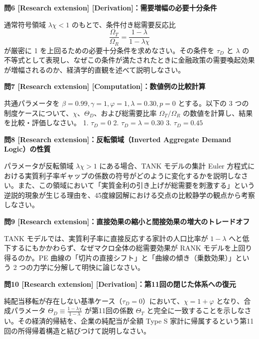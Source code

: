\documentclass[
  japanese,
  lualatex,
  ja=standard,
  12pt,
  a4paper]{ltjsarticle}
\begin{document}

\textbf{問6 {[}Research extension{]}
{[}Derivation{]}：需要増幅の必要十分条件}

通常符号領域 \(\lambda\chi < 1\) のもとで、条件付き総需要反応比 \[
\frac{\Omega_T}{\Omega_R} = \frac{1-\lambda}{1-\lambda\chi}
\] が厳密に 1 を上回るための必要十分条件を求めなさい。その条件を
\(\tau_D\) と \(\lambda\)
の不等式として表現し、なぜこの条件が満たされたときに金融政策の需要喚起効果が増幅されるのか、経済学的直観を述べて説明しなさい。


\textbf{問7 {[}Research extension{]}
{[}Computation{]}：数値例の比較計算}

共通パラメータを \(\beta=0.99, \gamma=1, \varphi=1, \lambda=0.30, p=0\)
とする。以下の 3
つの制度ケースについて、\(\chi\)、\(\Theta_D\)、および総需要比率
\(\Omega_T / \Omega_R\) の数値を計算し、結果を比較・評価しなさい。 1.
\(\tau_D = 0\) 2. \(\tau_D = \lambda = 0.30\) 3. \(\tau_D = 0.45\)


\textbf{問8 {[}Research extension{]}：反転領域（Inverted Aggregate
Demand Logic）の性質}

パラメータが反転領域 \(\lambda\chi > 1\) にある場合、TANK モデルの集計
Euler
方程式における実質利子率ギャップの係数の符号がどのように変化するかを説明しなさい。また、この領域において「実質金利の引き上げが総需要を刺激する」という逆説的現象が生じる理由を、45度線図解における交点の比較静学の観点から考察しなさい。


\textbf{問9 {[}Research
extension{]}：直接効果の縮小と間接効果の増大のトレードオフ}

TANK モデルでは、実質利子率に直接反応する家計の人口比率が \(1-\lambda\)
へと低下するにもかかわらず、なぜマクロ全体の総需要効果が RANK
モデルを上回り得るのか。PE
曲線の「切片の直接シフト」と「曲線の傾き（乗数効果）」という 2
つの力学に分解して明快に論じなさい。


\textbf{問10 {[}Research extension{]}
{[}Derivation{]}：第11回の閉じた体系への復元}

純配当移転が存在しない基準ケース（\(\tau_D = 0\)）において、\(\chi = 1+\varphi\)
となり、合成パラメータ
\(\Theta_D \equiv \frac{1-\lambda\chi}{1-\lambda}\) が第11回の係数
\(\Theta_T\)
と完全に一致することを示しなさい。その経済的帰結を、企業の純配当が全額
Type S
家計に帰属するという第11回の所得帰着構造と結びつけて説明しなさい。
\end{document}
